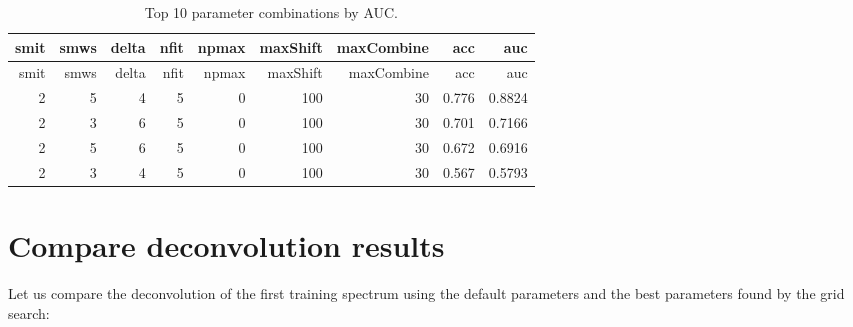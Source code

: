 \documentclass[
]{article}
\newenvironment{Shaded}{\begin{snugshade}}{\end{snugshade}}
\newcommand{\DataTypeTok}[1]{\textcolor[rgb]{0.13,0.29,0.53}{#1}}
\newcommand{\DecValTok}[1]{\textcolor[rgb]{0.00,0.00,0.81}{#1}}
\newcommand{\KeywordTok}[1]{\textcolor[rgb]{0.13,0.29,0.53}{\textbf{#1}}}
\newcommand{\NormalTok}[1]{#1}
\newcommand{\OperatorTok}[1]{\textcolor[rgb]{0.81,0.36,0.00}{\textbf{#1}}}
\newcommand{\OtherTok}[1]{\textcolor[rgb]{0.56,0.35,0.01}{#1}}
\newcommand{\StringTok}[1]{\textcolor[rgb]{0.31,0.60,0.02}{#1}}
\begin{document}
\begin{Shaded}
\end{Shaded}

\begin{longtable}[]{@{}rrrrrrrrr@{}}
\caption{Top 10 parameter combinations by AUC.}\tabularnewline
\toprule
smit & smws & delta & nfit & npmax & maxShift & maxCombine & acc &
auc\tabularnewline
\midrule
\endfirsthead
\toprule
smit & smws & delta & nfit & npmax & maxShift & maxCombine & acc &
auc\tabularnewline
\midrule
\endhead
2 & 5 & 4 & 5 & 0 & 100 & 30 & 0.776 & 0.8824\tabularnewline
2 & 3 & 6 & 5 & 0 & 100 & 30 & 0.701 & 0.7166\tabularnewline
2 & 5 & 6 & 5 & 0 & 100 & 30 & 0.672 & 0.6916\tabularnewline
2 & 3 & 4 & 5 & 0 & 100 & 30 & 0.567 & 0.5793\tabularnewline
\bottomrule
\end{longtable}

\hypertarget{compare-deconvolution-results}{%
\section{Compare deconvolution
results}\label{compare-deconvolution-results}}

Let us compare the deconvolution of the first training spectrum using
the default parameters and the best parameters found by the grid search:
\end{document}
